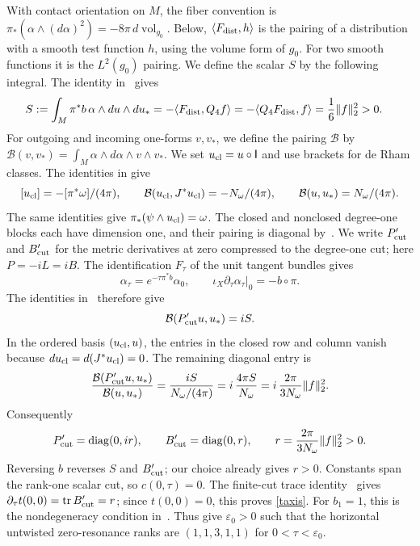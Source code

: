 \documentclass[11pt,letterpaper,reqno]{amsart}
\theoremstyle{remark}
\newcommand{\tr}{\operatorname{tr}}
\begin{document}
With contact orientation on $M$, the fiber convention is
$\pi_*(\alpha\wedge(d\alpha)^2)=-8\pi\,d\operatorname{vol}_{g_0}$.
Below, $\langle F_{\rm dist},h\rangle$ is the pairing of a distribution
with a smooth test function $h$, using the volume form of $g_0$.
For two smooth functions it is the $L^2(g_0)$ pairing.
We define the scalar $S$ by the following integral.
The identity in~\cite[(5.6)]{CDDP} gives
\[
 \begin{aligned}
 S&:=\int_M\pi^*b\,\alpha\wedge du\wedge du_*=-\langle F_{\rm dist},Q_4f\rangle
   =-\langle Q_4F_{\rm dist},f\rangle
   =\frac16\|f\|_2^2>0.
 \end{aligned}
\]
For outgoing and incoming one-forms $v,v_*$, we define the pairing
$\mathcal B$ by
$\mathcal B(v,v_*)=\int_M\alpha\wedge d\alpha\wedge v\wedge v_*$.
We set $u_{\rm cl}=u\circ\mathsf I$ and use brackets for de Rham
classes. The identities in
\cite[Lemmas~2.10 and 3.5, (3.57), (3.67), and the calculation preceding (3.59)]{CDDP}
give
\[
 [u_{\rm cl}]=-[\pi^*\omega]/(4\pi),\qquad
 \mathcal B(u_{\rm cl},J^*u_{\rm cl})=-N_\omega/(4\pi),\qquad
 \mathcal B(u,u_*)=N_\omega/(4\pi).
\]
The same identities give $\pi_*(\psi\wedge u_{\rm cl})=\omega$.
The closed and nonclosed degree-one blocks each have dimension one,
and their pairing is diagonal by~\cite[(3.55)--(3.57)]{CDDP}.
We write $P'_{\rm cut}$ and $B'_{\rm cut}$ for the metric derivatives
at zero compressed to the degree-one cut; here $P=-iL=iB$.
The identification $F_\tau$ of the unit tangent bundles gives
\[
 \alpha_\tau=e^{-\tau\pi^*b}\alpha_0,
 \qquad\iota_X\partial_\tau\alpha_\tau|_0=-b\circ\pi.
\]
The identities in~\cite[Lemma~4.4, (4.22), and (4.38)]{CDDP} therefore give
\[
 \mathcal B(P'_{\rm cut}u,u_*)=iS.
\]
In the ordered basis $(u_{\rm cl},u)$, the entries in the closed row
and column vanish because $du_{\rm cl}=d(J^*u_{\rm cl})=0$.
The remaining diagonal entry is
\[
 \frac{\mathcal B(P'_{\rm cut}u,u_*)}{\mathcal B(u,u_*)}
 =\frac{iS}{N_\omega/(4\pi)}
 =i\,\frac{4\pi S}{N_\omega}
 =i\,\frac{2\pi}{3N_\omega}\|f\|_2^2.
\]
Consequently
\begin{equation}\label{app:positivevariation}
 P'_{\rm cut}=\operatorname{diag}(0,ir),\qquad
 B'_{\rm cut}=\operatorname{diag}(0,r),\qquad
 r=\frac{2\pi}{3N_\omega}\|f\|_2^2>0.
\end{equation}
Reversing $b$ reverses $S$ and $B'_{\rm cut}$; our choice already gives
$r>0$. Constants span the rank-one scalar cut, so $c(0,\tau)=0$.
The finite-cut trace identity~\cite[Lemma~A.2]{CD} gives
$\partial_\tau t(0,0)=\tr B'_{\rm cut}=r$; since $t(0,0)=0$,
this proves \eqref{taxis}.
For $b_1=1$, this is the nondegeneracy condition
in~\cite[Theorem~3]{CDDP}. Thus
\cite[Theorem~3 and Corollary~4.1]{CDDP} give $\varepsilon_0>0$ such that
the horizontal untwisted zero-resonance ranks are $(1,1,3,1,1)$
for $0<\tau<\varepsilon_0$.
\end{document}
